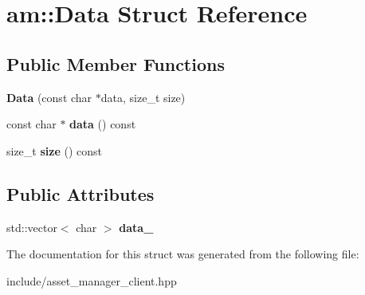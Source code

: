 \hypertarget{structam_1_1_data}{
\section{am::Data Struct Reference}
\label{structam_1_1_data}
}
\subsection*{Public Member Functions}
\begin{DoxyCompactItemize}
\item 
\hypertarget{structam_1_1_data_a781dad90ff1010fe970753372bbbe8d5}{
{\bfseries Data} (const char $\ast$data, size\_\-t size)}
\label{structam_1_1_data_a781dad90ff1010fe970753372bbbe8d5}

\item 
\hypertarget{structam_1_1_data_a13521873b41f97c17a13f8c36f063320}{
const char $\ast$ {\bfseries data} () const }
\label{structam_1_1_data_a13521873b41f97c17a13f8c36f063320}

\item 
\hypertarget{structam_1_1_data_acd2c8e6e48fb3cd7cec90d1e0db5cc1e}{
size\_\-t {\bfseries size} () const }
\label{structam_1_1_data_acd2c8e6e48fb3cd7cec90d1e0db5cc1e}

\end{DoxyCompactItemize}
\subsection*{Public Attributes}
\begin{DoxyCompactItemize}
\item 
\hypertarget{structam_1_1_data_a39f5211a5dfed79ccd68d3c1155fd97f}{
std::vector$<$ char $>$ {\bfseries data\_\-}}
\label{structam_1_1_data_a39f5211a5dfed79ccd68d3c1155fd97f}

\end{DoxyCompactItemize}


The documentation for this struct was generated from the following file:\begin{DoxyCompactItemize}
\item 
include/asset\_\-manager\_\-client.hpp\end{DoxyCompactItemize}
